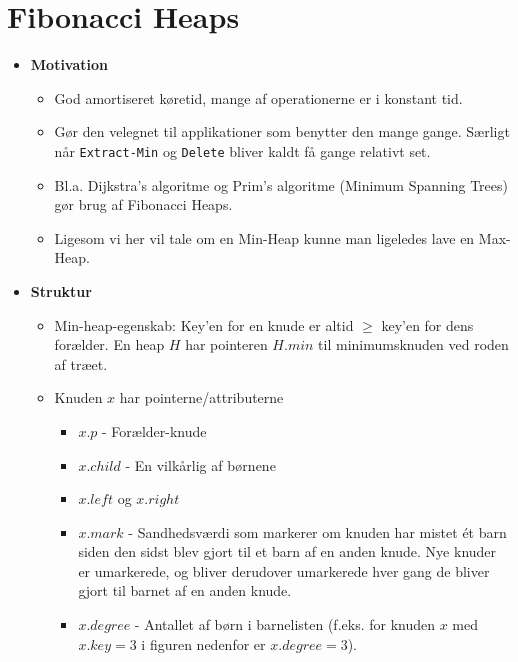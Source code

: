 \newpage
\section{Fibonacci Heaps}



\begin{itemize}
\item \textbf{Motivation}
\begin{itemize}
	\item God amortiseret køretid, mange af operationerne er i konstant tid.
	\item Gør den velegnet til applikationer som benytter den mange gange. Særligt når \texttt{Extract-Min} og \texttt{Delete} bliver kaldt få gange relativt set.
	\item Bl.a. Dijkstra's algoritme og Prim's algoritme (Minimum Spanning Trees) gør brug af Fibonacci Heaps.
	\item Ligesom vi her vil tale om en Min-Heap kunne man ligeledes lave en Max-Heap.
\end{itemize}



\item \textbf{Struktur}

\begin{itemize}
	\item Min-heap-egenskab: Key'en for en knude er altid $\geq$ key'en for dens forælder. En heap $H$ har pointeren $H.min$ til minimumsknuden ved roden af træet.
	\item Knuden $x$ har pointerne/attributerne
	\begin{itemize}
		\item $x.p$ - Forælder-knude
		\item $x.child$ - En vilkårlig af børnene
		\item $x.left$ og $x.right$
		\item $x.mark$ - Sandhedsværdi som markerer om knuden har mistet ét barn siden den sidst blev gjort til et barn af en anden knude. Nye knuder er umarkerede, og bliver derudover umarkerede hver gang de bliver gjort til barnet af en anden knude.
		\item $x.degree$ - Antallet af børn i barnelisten (f.eks. for knuden $x$ med $x.key = 3$ i figuren nedenfor er $x.degree = 3$).
	\end{itemize}
	

\end{itemize}
\end{itemize}

